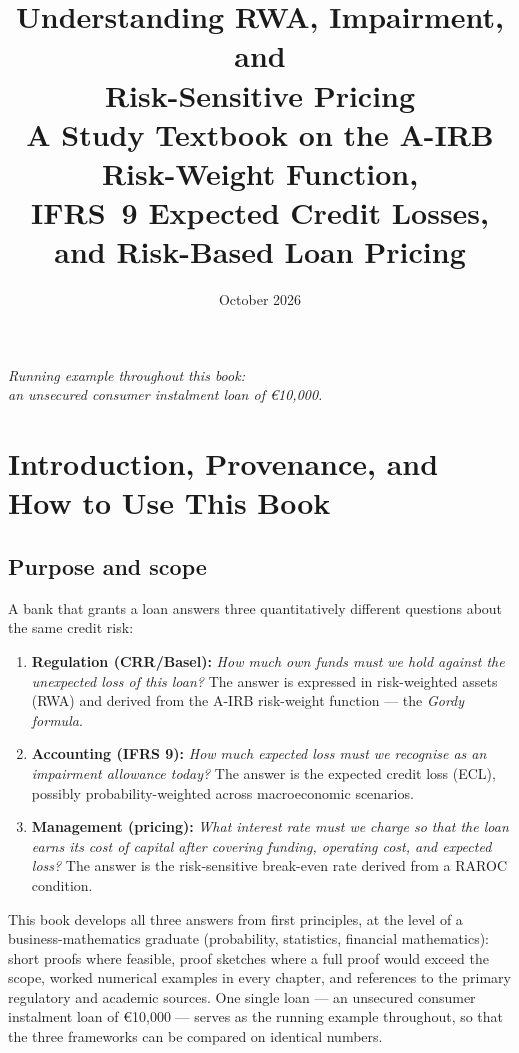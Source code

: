 \documentclass[11pt,a4paper]{report}
\title{\textbf{Understanding RWA, Impairment, and\\[2mm] Risk-Sensitive Pricing}\\[6mm]
\large A Study Textbook on the A-IRB Risk-Weight Function,\\ IFRS~9 Expected Credit Losses, and Risk-Based Loan Pricing}
\author{}
\date{October 2026}
\renewcommand{\EUR}[1]{\euro#1}
\theoremstyle{definition}
\theoremstyle{plain}
\begin{document}
\maketitle
\thispagestyle{empty}
\vfill
\begin{center}
\itshape Running example throughout this book:\\
an unsecured consumer instalment loan of \EUR{10{,}000}.
\end{center}
\vfill

\tableofcontents

\chapter{Introduction, Provenance, and How to Use This Book}

\section{Purpose and scope}

A bank that grants a loan answers three quantitatively different
questions about the same credit risk:

\begin{enumerate}[label=(\alph*)]
  \item \textbf{Regulation (CRR/Basel):} \emph{How much own funds must we
        hold against the \emph{unexpected} loss of this loan?} The answer
        is expressed in risk-weighted assets (RWA) and derived from the
        A-IRB risk-weight function --- the \emph{Gordy formula}.
  \item \textbf{Accounting (IFRS 9):} \emph{How much \emph{expected} loss
        must we recognise as an impairment allowance today?} The answer is
        the expected credit loss (ECL), possibly probability-weighted
        across macroeconomic scenarios.
  \item \textbf{Management (pricing):} \emph{What interest rate must we
        charge so that the loan earns its cost of capital after covering
        funding, operating cost, and expected loss?} The answer is the
        risk-sensitive break-even rate derived from a RAROC condition.
\end{enumerate}

This book develops all three answers from first principles, at the level
of a business-mathematics graduate (probability, statistics, financial
mathematics): short proofs where feasible, proof sketches where a full
proof would exceed the scope, worked numerical examples in every chapter,
and references to the primary regulatory and academic sources. One single
loan --- an unsecured consumer instalment loan of \EUR{10{,}000} ---
serves as the running example throughout, so that the three frameworks
can be compared on identical numbers.
\end{document}
